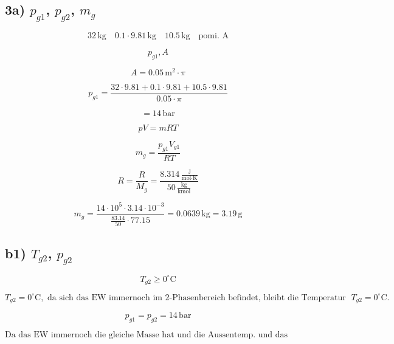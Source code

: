 \subsection*{3a) $p_{g1}$, $p_{g2}$, $m_g$}

\[
32 \, \text{kg} \quad 0.1 \cdot 9.81 \, \text{kg} \quad \text{10.5} \, \text{kg} \quad \text{pomi. A}
\]

\[
p_{g1}, A
\]

\[
A = 0.05 \, \text{m}^2 \cdot \pi
\]

\[
p_{g1} = \frac{32 \cdot 9.81 + 0.1 \cdot 9.81 + 10.5 \cdot 9.81}{0.05 \cdot \pi}
\]

\[
= 14 \, \text{bar}
\]

\[
pV = mRT
\]

\[
m_g = \frac{p_{g1} V_{g1}}{RT}
\]

\[
R = \frac{R}{M_g} = \frac{8.314 \, \frac{\text{J}}{\text{mol} \cdot \text{K}}}{50 \, \frac{\text{kg}}{\text{kmol}}}
\]

\[
m_g = \frac{14 \cdot 10^5 \cdot 3.14 \cdot 10^{-3}}{\frac{83.14}{50} \cdot 77.15} = 0.0639 \, \text{kg} = 3.19 \, \text{g}
\]

\subsection*{b1) $T_{g2}$, $p_{g2}$}

\[
T_{g2} \geq 0^\circ \text{C}
\]

\[
T_{g2} = 0^\circ \text{C}, \text{ da sich das EW immernoch im 2-Phasenbereich befindet, bleibt die Temperatur gleich und da das ganze System im GGW ist, ist auch } T_{g2} = 0^\circ \text{C}.
\]

\[
p_{g1} = p_{g2} = 14 \, \text{bar}
\]

\[
\text{Da das EW immernoch die gleiche Masse hat und die Aussentemp. und das Gewicht des Kolbens gleich bleiben, bleibt auch der Druck im GGW gleich.}
\]